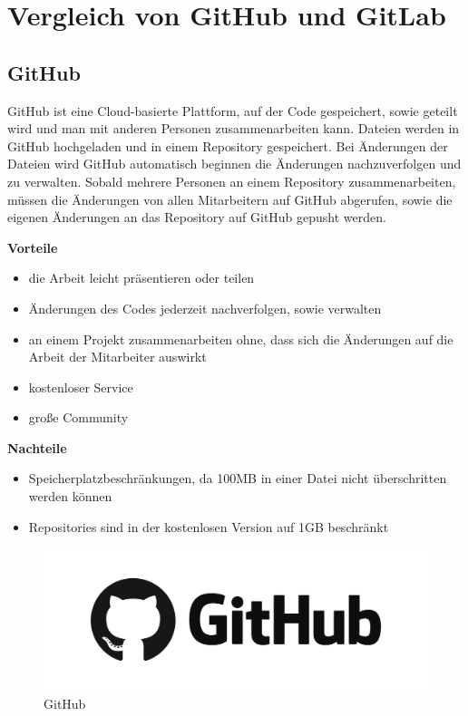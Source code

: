 \newpage
\section{Vergleich von GitHub und GitLab}
\subsection{GitHub}
GitHub ist eine Cloud-basierte Plattform, auf der Code gespeichert, sowie geteilt wird und man mit anderen Personen zusammenarbeiten kann. Dateien werden in GitHub hochgeladen und in einem Repository gespeichert. Bei Änderungen der Dateien wird GitHub automatisch beginnen die Änderungen nachzuverfolgen und zu verwalten. Sobald mehrere Personen an einem Repository zusammenarbeiten, müssen die Änderungen von allen Mitarbeitern auf GitHub abgerufen, sowie die eigenen Änderungen an das Repository auf GitHub gepusht werden. \parencite{GitHubUndGit}

\textbf{Vorteile}
\begin{itemize}
	\item die Arbeit leicht präsentieren oder teilen
	\item Änderungen des Codes jederzeit nachverfolgen, sowie verwalten
	\item an einem Projekt zusammenarbeiten ohne, dass sich die Änderungen auf die Arbeit der Mitarbeiter auswirkt
	\item kostenloser Service
	\item große Community
\end{itemize}

\textbf{Nachteile}
\begin{itemize}
	\item Speicherplatzbeschränkungen, da 100MB in einer Datei nicht überschritten werden können
	\item Repositories sind in der kostenlosen Version auf 1GB beschränkt
\end{itemize}


\begin{figure}[H]
	\centering
	\includegraphics[width=0.5\linewidth]{images/GitHub.png}
	\caption[GitHub]{GitHub}
	\label{fig:GitHub}
\end{figure}

